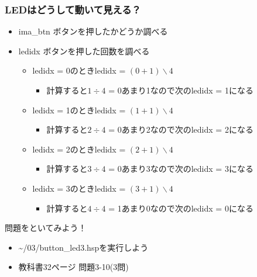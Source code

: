 \begin{frame}
  \frametitle{LEDはどうして動いて見える？}
  \begin{itemize}
    \item ima\_btn ボタンを押したかどうか調べる
    \item ledidx ボタンを押した回数を調べる
    \begin{itemize}
      \item ledidx = 0のときledidx = $(0+1)\backslash4$
      \begin{itemize}
        \item 計算すると$1\div4$ = 0あまり1なので次のledidx = 1になる
      \end{itemize}
      \item ledidx = 1のときledidx = $(1+1)\backslash4$ 
      \begin{itemize}
        \item 計算すると$2\div4$ = 0あまり2なので次のledidx = 2になる 
      \end{itemize}
      \item ledidx = 2のときledidx = $(2+1)\backslash4$ 
      \begin{itemize}
        \item 計算すると$3\div4$ = 0あまり3なので次のledidx = 3になる
      \end{itemize}
      \item ledidx = 3のときledidx = $(3+1)\backslash4$ 
      \begin{itemize}
        \item 計算すると$4\div4$ = 1あまり0なので次のledidx = 0になる
      \end{itemize}
    \end{itemize}
  \end{itemize}
\end{frame}

\begin{frame}
  \begin{exampleblock}{問題をといてみよう！}
    \begin{itemize}
      \item \sim/03/button\_led3.hspを実行しよう
      \item 教科書32ページ 問題3-10(3問)
    \end{itemize}
  \end{exampleblock} 
\end{frame}
